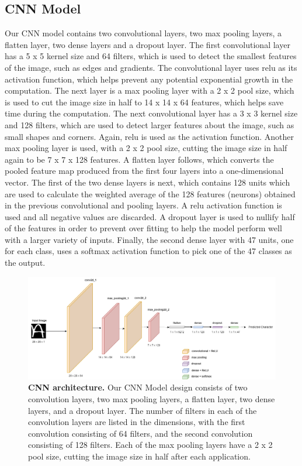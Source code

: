 \documentclass[conference]{IEEEtran}
\begin{document}
\subsection{CNN Model}

Our CNN model contains two convolutional layers, two max pooling layers, a flatten layer, two dense layers and a dropout layer. The first convolutional layer has a 5 x 5 kernel size and 64 filters, which is used to detect the smallest features of the image, such as edges and gradients. The convolutional layer uses relu as its activation function, which helps prevent any potential exponential growth in the computation. The next layer is a max pooling layer with a 2 x 2 pool size, which is used to cut the image size in half to 14 x 14 x 64 features, which helps save time during the computation. The next convolutional layer has a 3 x 3 kernel size and 128 filters, which are used to detect larger features about the image, such as small shapes and corners. Again, relu is used as the activation function. Another max pooling layer is used, with a 2 x 2 pool size, cutting the image size in half again to be 7 x 7 x 128 features. A flatten layer follows, which converts the pooled feature map produced from the first four layers into a one-dimensional vector. The first of the two dense layers is next, which contains 128 units which are used to calculate the weighted average of the 128 features (neurons) obtained in the previous convolutional and pooling layers. A relu activation function is used and all negative values are discarded. A dropout layer is used to nullify half of the features in order to prevent over fitting to help the model perform well with a larger variety of inputs. Finally, the second dense layer with 47 units, one for each class, uses a softmax activation function to pick one of the 47 classes as the output. 

\begin{figure}[h!]
\centering
\includegraphics[width=1\linewidth]{images/CNN_Design.jpg}
\caption{\textbf{CNN architecture.} Our CNN Model design consists of two convolution layers, two max pooling layers, a flatten layer, two dense layers, and a dropout layer. The number of filters in each of the convolution layers are listed in the dimensions, with the first convolution consisting of 64 filters, and the second convolution consisting of 128 filters. Each of the max pooling layers have a 2 x 2 pool size,  cutting the image size in half after each application. }
\label{fig:cnn}
\end{figure}
\end{document}
